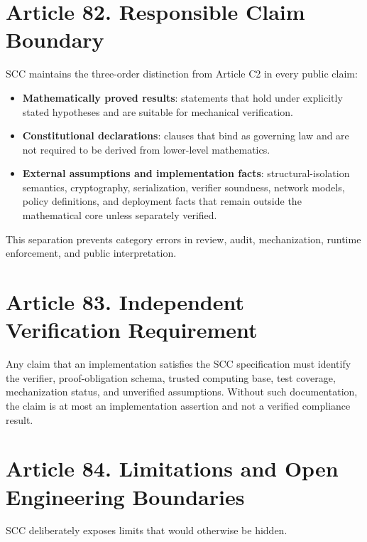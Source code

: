 \documentclass[10pt,oneside]{article}
\theoremstyle{definition}
\theoremstyle{remark}
\begin{document}
\section{Article 82. Responsible Claim Boundary}
SCC maintains the three-order distinction from Article C2 in every public claim:
\begin{itemize}
  \item \textbf{Mathematically proved results}: statements that hold under explicitly stated hypotheses and are suitable for mechanical verification.
  \item \textbf{Constitutional declarations}: clauses that bind as governing law and are not required to be derived from lower-level mathematics.
  \item \textbf{External assumptions and implementation facts}: structural-isolation semantics, cryptography, serialization, verifier soundness, network models, policy definitions, and deployment facts that remain outside the mathematical core unless separately verified.
\end{itemize}
This separation prevents category errors in review, audit, mechanization, runtime enforcement, and public interpretation.

\section{Article 83. Independent Verification Requirement}
Any claim that an implementation satisfies the SCC specification must identify the verifier, proof-obligation schema, trusted computing base, test coverage, mechanization status, and unverified assumptions. Without such documentation, the claim is at most an implementation assertion and not a verified compliance result.

\section{Article 84. Limitations and Open Engineering Boundaries}
SCC deliberately exposes limits that would otherwise be hidden.
\end{document}
